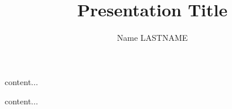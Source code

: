 \documentclass{beamer}
\author{Name LASTNAME}
\date{}
\institute{Direction interministérielle du numérique \\ Etalab}
\title{Presentation Title}
\subtitle{}
\begin{document}
	
	\maketitle
	
	\begin{frame}
	content...
	\end{frame}

	\begin{frame}
	content...
	\end{frame}
\end{document}
